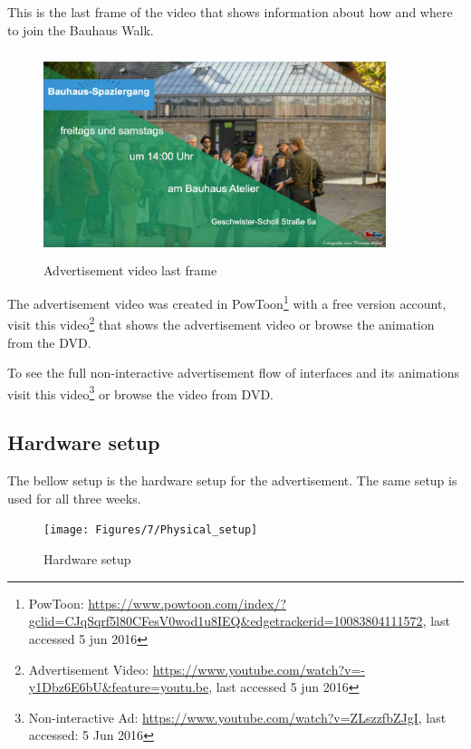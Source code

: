 \begin{enumerate}
This is the last frame of the video that shows information about how and where to join the Bauhaus Walk.

\begin{figure}[H]
    \centering
    \includegraphics[width=100mm,height=60mm]{Figures/7/ad_last}
    \caption{Advertisement video last frame}%
    \label{fig:adthirdpage2}%
\end{figure}

The advertisement video was created in PowToon\footnote{PowToon: \url{https://www.powtoon.com/index/?gclid=CJqSqrf5l80CFesV0wod1u8IEQ&edgetrackerid=10083804111572}, last accessed 5 jun 2016} with a free version account, visit this video\footnote{Advertisement Video:  \url{https://www.youtube.com/watch?v=-y1Dbz6E6bU&feature=youtu.be}, last accessed 5 jun 2016} that shows the advertisement video or browse the animation from the DVD. 

To see the full non-interactive advertisement flow of interfaces and its animations visit this video\footnote{Non-interactive Ad: \url{https://www.youtube.com/watch?v=ZLszzfbZJgI}, last accessed: 5 Jun 2016} or browse the video from DVD.

\end{enumerate}

\iffalse
\subsection{Hardware setup}
The bellow setup is the hardware setup for the advertisement. The same setup is used for all three weeks.

\begin{figure}[H]
    \centering
    \texttt{[image: Figures/7/Physical\_setup]}
    \caption{Hardware setup}%
    \label{fig:hardwaresetup}%
\end{figure}



